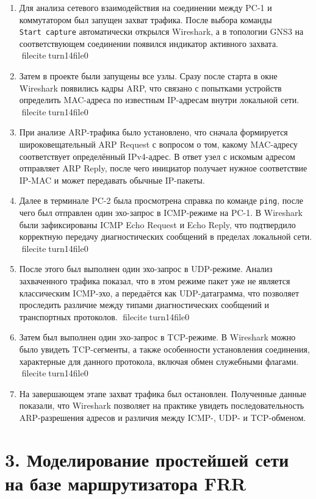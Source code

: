 \documentclass[
  english,
  russian,
  12pt,
  a4paper,
  DIV=11,
  numbers=noendperiod]{scrreprt}
\begin{document}
\begin{enumerate}
\def\labelenumi{\arabic{enumi}.}
\item
  Для анализа сетевого взаимодействия на соединении между PC-1 и
  коммутатором был запущен захват трафика. После выбора команды
  \texttt{Start\ capture} автоматически открылся Wireshark, а в
  топологии GNS3 на соответствующем соединении появился индикатор
  активного захвата. fileciteturn14file0
\item
  Затем в проекте были запущены все узлы. Сразу после старта в окне
  Wireshark появились кадры ARP, что связано с попытками устройств
  определить MAC-адреса по известным IP-адресам внутри локальной сети.
  fileciteturn14file0
\item
  При анализе ARP-трафика было установлено, что сначала формируется
  широковещательный ARP Request с вопросом о том, какому MAC-адресу
  соответствует определённый IPv4-адрес. В ответ узел с искомым адресом
  отправляет ARP Reply, после чего инициатор получает нужное
  соответствие IP-MAC и может передавать обычные IP-пакеты.
\item
  Далее в терминале PC-2 была просмотрена справка по команде
  \texttt{ping}, после чего был отправлен один эхо-запрос в ICMP-режиме
  на PC-1. В Wireshark были зафиксированы ICMP Echo Request и Echo
  Reply, что подтвердило корректную передачу диагностических сообщений в
  пределах локальной сети. fileciteturn14file0
\item
  После этого был выполнен один эхо-запрос в UDP-режиме. Анализ
  захваченного трафика показал, что в этом режиме пакет уже не является
  классическим ICMP-эхо, а передаётся как UDP-датаграмма, что позволяет
  проследить различие между типами диагностических сообщений и
  транспортных протоколов. fileciteturn14file0
\item
  Затем был выполнен один эхо-запрос в TCP-режиме. В Wireshark можно
  было увидеть TCP-сегменты, а также особенности установления
  соединения, характерные для данного протокола, включая обмен
  служебными флагами. fileciteturn14file0
\item
  На завершающем этапе захват трафика был остановлен. Полученные данные
  показали, что Wireshark позволяет на практике увидеть
  последовательность ARP-разрешения адресов и различия между ICMP-, UDP-
  и TCP-обменом.
\end{enumerate}

\section{3. Моделирование простейшей сети на базе маршрутизатора
FRR}\label{ux43cux43eux434ux435ux43bux438ux440ux43eux432ux430ux43dux438ux435-ux43fux440ux43eux441ux442ux435ux439ux448ux435ux439-ux441ux435ux442ux438-ux43dux430-ux431ux430ux437ux435-ux43cux430ux440ux448ux440ux443ux442ux438ux437ux430ux442ux43eux440ux430-frr}
\end{document}
